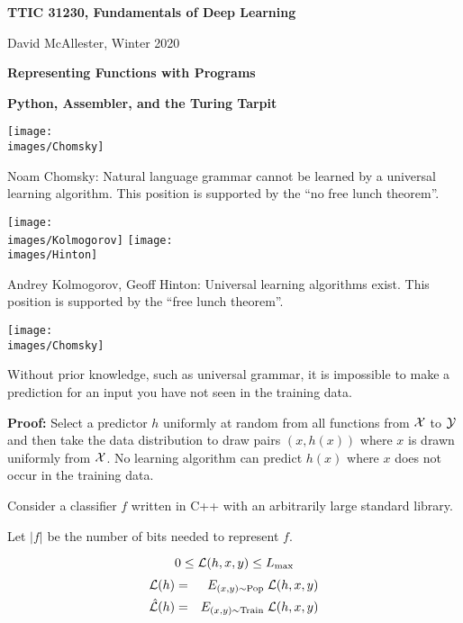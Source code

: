 




{\Huge

  \centerline{\bf TTIC 31230, Fundamentals of Deep Learning}
  \bigskip
  \centerline{David McAllester, Winter 2020}

  \vfill
  \centerline{\bf Representing Functions with Programs}
  \vfill
  \centerline{\bf Python, Assembler, and the Turing Tarpit}

  \vfill
  \vfill


\texttt{[image: \\images/Chomsky]} \begin{minipage}[b]{8in} Noam Chomsky: 
Natural language grammar cannot be learned by a universal learning algorithm.
This position is supported by the ``no free lunch theorem''.\end{minipage}

\vfill
\texttt{[image: \\images/Kolmogorov]}
\texttt{[image: \\images/Hinton]}
\begin{minipage}[b]{7in}
Andrey Kolmogorov, Geoff Hinton: Universal learning algorithms exist. This position is supported by the ``free lunch theorem''.
\end{minipage}


\texttt{[image: \\images/Chomsky]} 

Without prior knowledge, such as universal grammar, it is impossible to make a prediction for an input you have not seen in the training data.


\vfill
{\bf Proof:} Select a predictor $h$ uniformly at random from all functions from ${\cal X}$ to ${\cal Y}$ and then take the data distribution to draw pairs $(x, h(x))$
where $x$ is drawn uniformly from ${\cal X}$.  No learning algorithm can predict $h(x)$ where $x$ does not occur in the training data.



Consider a classifier $f$ written in C++ with an arbitrarily large standard library.

\vfill
Let $|f|$ be the number of bits needed to represent $f$.


\vfill
$$0 \leq {\cal L}(h,x,y) \leq L_{\max}$$
\begin{eqnarray*}
{\cal L}(h)  & = &  E_{(x,y)\sim \mathrm{Pop}}\;{\cal L}(h,x,y) \\
\hat{{\cal L}}(h) & = & E_{(x,y)\sim \mathrm{Train}}\;{\cal L}(h,x,y)
\end{eqnarray*}

}
